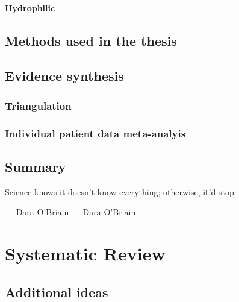 \documentclass[a4paper, twoside]{templates/ociamthesis}
\begin{document}
\hypertarget{hydrophilic}{%
\subsubsection{Hydrophilic}\label{hydrophilic}}

\hypertarget{methods-used-in-the-thesis}{%
\section{Methods used in the thesis}\label{methods-used-in-the-thesis}}

\hypertarget{evidence-synthesis}{%
\section{Evidence synthesis}\label{evidence-synthesis}}

\hypertarget{triangulation}{%
\subsection{Triangulation}\label{triangulation}}

\hypertarget{individual-patient-data-meta-analyis}{%
\subsection{Individual patient data meta-analyis}\label{individual-patient-data-meta-analyis}}

\hypertarget{summary-1}{%
\section{Summary}\label{summary-1}}

\begin{savequote}
Science knows it doesn't know everything; otherwise, it'd stop
\end{savequote}

--- Dara O'Briain --- Dara O'Briain

\hypertarget{sys-rev-heading}{%
\chapter{Systematic Review}\label{sys-rev-heading}}

\minitoc 

\hypertarget{additional-ideas}{%
\section{Additional ideas}\label{additional-ideas}}
\end{document}

